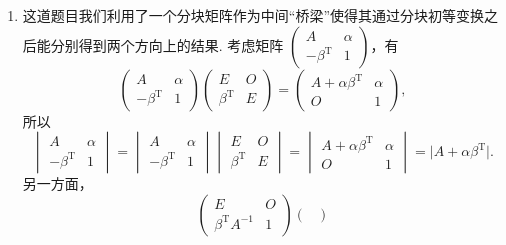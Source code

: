 \begin{enumerate}
    \item 这道题目我们利用了一个分块矩阵作为中间“桥梁”使得其通过分块初等变换之后能分别得到两个方向上的结果. 考虑矩阵 $\begin{pmatrix}
                  A                   & \alpha \\
                  -\beta^{\mathrm{T}} & 1
              \end{pmatrix}$，有
          \[\begin{pmatrix}
                  A                   & \alpha \\
                  -\beta^{\mathrm{T}} & 1
              \end{pmatrix} \begin{pmatrix}
                  E                  & O \\
                  \beta^{\mathrm{T}} & E
              \end{pmatrix} = \begin{pmatrix}
                  A+\alpha \beta^{\mathrm{T}} & \alpha \\
                  O                           & 1
              \end{pmatrix},\]
          所以
          \[\begin{vmatrix}
                  A                   & \alpha \\
                  -\beta^{\mathrm{T}} & 1
              \end{vmatrix} = \begin{vmatrix}
                  A                   & \alpha \\
                  -\beta^{\mathrm{T}} & 1
              \end{vmatrix} \begin{vmatrix}
                  E                  & O \\
                  \beta^{\mathrm{T}} & E
              \end{vmatrix} = \begin{vmatrix}
                  A+\alpha \beta^{\mathrm{T}} & \alpha \\
                  O                           & 1
              \end{vmatrix} = \lvert A+\alpha \beta^{\mathrm{T}} \rvert.\]
          另一方面，
          \[\begin{pmatrix}
                  E                        & O \\
                  \beta^{\mathrm{T}}A^{-1} & 1
              \end{pmatrix} \begin{pmatrix}

\end{pmatrix}\]
\end{enumerate}
